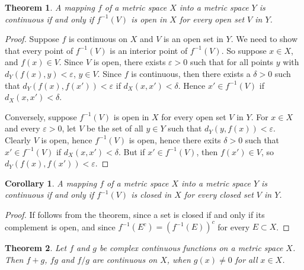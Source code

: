 \documentclass[10pt]{book}
\newtheorem{theorem}{Theorem}[chapter]
\newtheorem{corollary}{Corollary}[theorem]
\theoremstyle{definition}
\numberwithin{equation}{chapter}
\begin{document}
\medskip

\begin{theorem}\label{th_36}
A mapping $f$ of a metric space $X$ into a metric space $Y$ is continuous if and only if $f^{-1}(V)$ is open in $X$ for every open set $V$ in $Y$.
\end{theorem}
\begin{proof}
Suppose $f$ is continuous on $X$ and $V$ is an open set in $Y$. We need to show that every point of $f^{-1}(V)$ is an interior point of $f^{-1}(V)$. So suppose $x \in X$, and $f(x) \in V$. Since $V$ is open, there exists $\varepsilon > 0$ such that for all points $y$ with $d_Y(f(x),y) < \varepsilon$, $y \in V$. Since $f$ is continuous, then there exists a $\delta > 0$ such that $d_Y(f(x), f(x')) < \varepsilon$ if $d_X(x,x') < \delta$. Hence $x' \in f^{-1}(V)$ if $d_X(x,x') < \delta$.

Conversely, suppose $f^{-1}(V)$ is open in $X$ for every open set $V$ in $Y$. For $x \in X$ and every $\varepsilon > 0$, let $V$ be the set of all $y \in Y$ such that $d_Y(y,f(x)) < \varepsilon$. Clearly $V$ is open, hence $f^{-1}(V)$ is open, hence there exits $\delta > 0$ such that $x' \in f^{-1}(V)$ if $d_X(x,x') < \delta$. But if $x' \in f^{-1}(V)$, then $f(x') \in V$, so $d_Y(f(x), f(x')) < \varepsilon$.
\end{proof} 

\medskip

\begin{corollary}\label{coro_361}
A mapping $f$ of a metric space $X$ into a metric space $Y$ is continuous if and only if $f^{-1}(V)$ is closed in $X$ for every closed set $V$ in $Y$.
\end{corollary}
\begin{proof}
If follows from the theorem, since a set is closed if and only if its complement is open, and since $f^{-1}(E^c) = \left(f^{-1}(E)\right)^c$ for every $E \subset X$.
\end{proof}

\medskip

\begin{theorem}\label{th_37}
Let $f$ and $g$ be complex continuous functions on a metric space $X$. Then $f + g$, $fg$ and $f/g$ are continuous on $X$, when $g(x) \neq 0$ for all $x \in X$.
\end{theorem}

\medskip
\end{document}
